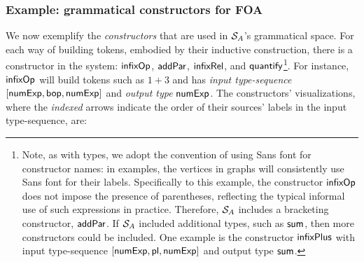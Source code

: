 \documentclass[a4paper]{article}
\theoremstyle{definition}
\begin{document}
	\subsubsection*{Example: grammatical constructors for FOA}
	We now exemplify the \textit{constructors} that are used in $\mathcal{S}_{A}$'s grammatical space. For each way of building tokens, embodied by their inductive construction, there is a constructor in the system: $\textsf{infixOp}$, $\textsf{addPar}$, $\textsf{infixRel}$, and $\textsf{quantify}$\footnote{Note, as with types, we adopt the convention of using \textsf{Sans} font for constructor names: in examples, the vertices in graphs will consistently use \textsf{Sans} font for their labels. Specifically to this example, the constructor $\textsf{infixOp}$ does not impose the presence of parentheses, reflecting the typical informal use of such expressions in practice. Therefore, $\mathcal{S}_{A}$ includes a bracketing constructor, $\textsf{addPar}$. If $\mathcal{S}_{A}$ included additional types, such as $\textsf{sum}$, then more constructors could be included. One example is the constructor $\textsf{infixPlus}$ with input type-sequence $[\textsf{numExp},\textsf{pl},\textsf{numExp}]$ and output type $\textsf{sum}$.}. For instance, $\textsf{infixOp}$ will build tokens such as $1+3$ and has \textit{input type-sequence} $[\textsf{numExp},\textsf{bop},\textsf{numExp}]$ and \textit{output type} $\textsf{numExp}$. The constructors' visualizations, where the \textit{indexed} arrows indicate the order of their sources' labels in the input type-sequence, are:
\end{document}
